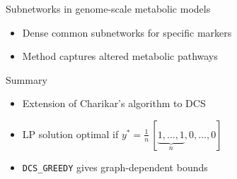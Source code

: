 \documentclass[final,t]{beamer}
\begin{document}
\begin{frame}{}
\begin{columns}[t]
\begin{column}{.30\linewidth}
\begin{block}{Subnetworks in  genome-scale metabolic models}
\begin{itemize}
\item Dense common subnetworks for specific markers
\item Method captures altered metabolic pathways
\end{itemize}
\begin{center}
\end{center}
\end{block}

\begin{block}{Summary}
\begin{itemize}
\item Extension of Charikar's algorithm to DCS 
\item LP solution optimal if  $y^{*} = \frac{1}{n} \, [ \underbrace{1, \ldots, 1}_{n}, 0, \ldots, 0]$ 
\item {\tt DCS\_GREEDY} gives graph-dependent bounds
\end{itemize}
\end{block}


\end{column}
\end{columns}
\end{frame}
\end{document}
